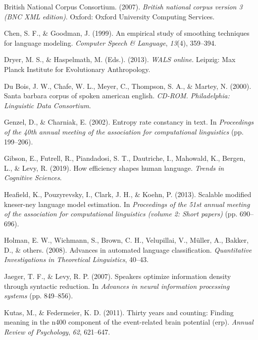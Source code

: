 \documentclass[10pt, letterpaper]{article}
\begin{document}
\leavevmode\hypertarget{ref-british-national-corpus-consortium2007}{}%
British National Corpus Consortium. (2007). \emph{British national
corpus version 3 (BNC XML edition)}. Oxford: Oxford University Computing
Services.

\leavevmode\hypertarget{ref-chen1999}{}%
Chen, S. F., \& Goodman, J. (1999). An empirical study of smoothing
techniques for language modeling. \emph{Computer Speech \& Language},
\emph{13}(4), 359--394.

\leavevmode\hypertarget{ref-2013}{}%
Dryer, M. S., \& Haspelmath, M. (Eds.). (2013). \emph{WALS online}.
Leipzig: Max Planck Institute for Evolutionary Anthropology.

\leavevmode\hypertarget{ref-sbc}{}%
Du Bois, J. W., Chafe, W. L., Meyer, C., Thompson, S. A., \& Martey, N.
(2000). Santa barbara corpus of spoken american english. \emph{CD-ROM.
Philadelphia: Linguistic Data Consortium}.

\leavevmode\hypertarget{ref-genzel2002}{}%
Genzel, D., \& Charniak, E. (2002). Entropy rate constancy in text. In
\emph{Proceedings of the 40th annual meeting of the association for
computational linguistics} (pp. 199--206).

\leavevmode\hypertarget{ref-gibson2019}{}%
Gibson, E., Futrell, R., Piandadosi, S. T., Dautriche, I., Mahowald, K.,
Bergen, L., \& Levy, R. (2019). How efficiency shapes human language.
\emph{Trends in Cognitive Sciences}.

\leavevmode\hypertarget{ref-heafield2013}{}%
Heafield, K., Pouzyrevsky, I., Clark, J. H., \& Koehn, P. (2013).
Scalable modified kneser-ney language model estimation. In
\emph{Proceedings of the 51st annual meeting of the association for
computational linguistics (volume 2: Short papers)} (pp. 690--696).

\leavevmode\hypertarget{ref-holman2008}{}%
Holman, E. W., Wichmann, S., Brown, C. H., Velupillai, V., Müller, A.,
Bakker, D., \& others. (2008). Advances in automated language
classification. \emph{Quantitative Investigations in Theoretical
Linguistics}, 40--43.

\leavevmode\hypertarget{ref-jaeger2007}{}%
Jaeger, T. F., \& Levy, R. P. (2007). Speakers optimize information
density through syntactic reduction. In \emph{Advances in neural
information processing systems} (pp. 849--856).

\leavevmode\hypertarget{ref-kutas2011}{}%
Kutas, M., \& Federmeier, K. D. (2011). Thirty years and counting:
Finding meaning in the n400 component of the event-related brain
potential (erp). \emph{Annual Review of Psychology}, \emph{62},
621--647.
\end{document}
